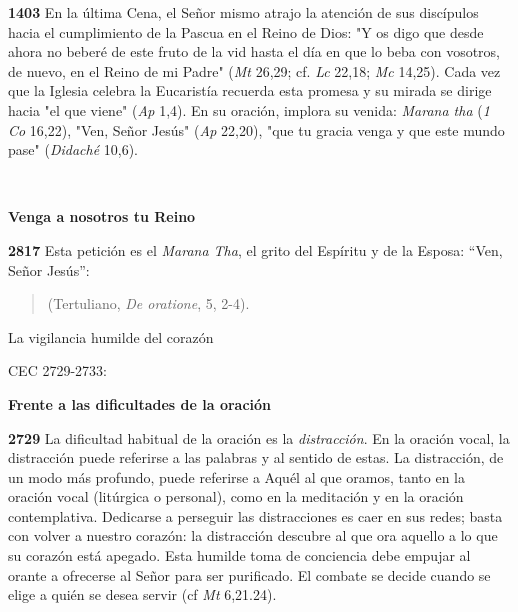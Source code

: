 \textbf{1403} En la última Cena, el Señor mismo atrajo la atención de sus discípulos hacia el cumplimiento de la Pascua en el Reino de Dios: "Y os digo que desde ahora no beberé de este fruto de la vid hasta el día en que lo beba con vosotros, de nuevo, en el Reino de mi Padre" (\emph{Mt} 26,29; cf. \emph{Lc} 22,18; \emph{Mc} 14,25). Cada vez que la Iglesia celebra la Eucaristía recuerda esta promesa y su mirada se dirige hacia "el que viene" (\emph{Ap} 1,4). En su oración, implora su venida: \emph{Marana tha} (\emph{1 Co} 16,22), "Ven, Señor Jesús" (\emph{Ap} 22,20), "que tu gracia venga y que este mundo pase" (\emph{Didaché} 10,6).

\textbf{\\ }

\textbf{Venga a nosotros tu Reino}

\textbf{2817} Esta petición es el \emph{Marana Tha}, el grito del Espíritu y de la Esposa: ``Ven, Señor Jesús'':

\begin{quote} 	 (Tertuliano, \emph{De oratione}, 5, 2-4). \end{quote}

La vigilancia humilde del corazón

CEC 2729-2733:

\textbf{Frente a las dificultades de la oración}

\textbf{2729} La dificultad habitual de la oración es la \emph{distracción}. En la oración vocal, la distracción puede referirse a las palabras y al sentido de estas. La distracción, de un modo más profundo, puede referirse a Aquél al que oramos, tanto en la oración vocal (litúrgica o personal), como en la meditación y en la oración contemplativa. Dedicarse a perseguir las distracciones es caer en sus redes; basta con volver a nuestro corazón: la distracción descubre al que ora aquello a lo que su corazón está apegado. Esta humilde toma de conciencia debe empujar al orante a ofrecerse al Señor para ser purificado. El combate se decide cuando se elige a quién se desea servir (cf \emph{Mt} 6,21.24).

